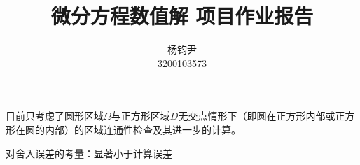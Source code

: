 \documentclass{ctexart}
\title{微分方程数值解 项目作业报告}
\author{杨钧尹\\ \small{3200103573}}
\date{}
\begin{document}
\maketitle


目前只考虑了圆形区域$\Omega$与正方形区域$D$无交点情形下（即圆在正方形内部或正方形在圆的内部）的区域连通性检查及其进一步的计算。

对舍入误差的考量：显著小于计算误差
\end{document}
